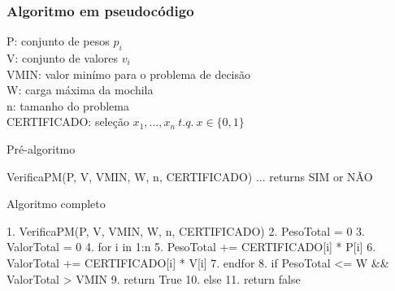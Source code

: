 \documentclass{beamer}
\begin{document}
\begin{frame}[fragile]
    \frametitle{Algoritmo em pseudocódigo}

    P: conjunto de pesos $p_{i}$ \\
    V: conjunto de valores $v_{i}$ \\
    VMIN: valor minímo para o problema de decisão \\
    W: carga máxima da mochila \\
    n: tamanho do problema \\
    CERTIFICADO: seleção $x_{1},...,x_{n}\ t.q.\ x \in \{0,1\}$ \\

    \begin{block}{Pré-algoritmo}
    \begin{semiverbatim}
    VerificaPM(P, V, VMIN, W, n, CERTIFICADO)
        ...
        returns SIM or NÃO
    \end{semiverbatim}
    \end{block}

\end{frame}

\begin{frame}[fragile]
    \begin{block}{Algoritmo completo}
        \begin{semiverbatim}
        1. VerificaPM(P, V, VMIN, W, n, CERTIFICADO)
        2.    PesoTotal = 0
        3.    ValorTotal = 0
        4.    for i in 1:n
        5.        PesoTotal += CERTIFICADO[i] * P[i]
        6.        ValorTotal += CERTIFICADO[i] * V[i]
        7.    endfor
        8.    if PesoTotal <= W && ValorTotal > VMIN
        9.        return True
        10.    else
        11.       return false
        \end{semiverbatim}
    \end{block}

\end{frame}
\end{document}
